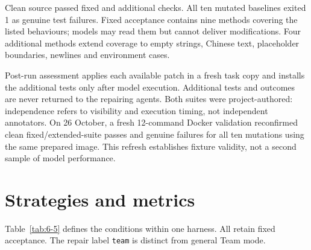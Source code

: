 Clean source passed fixed and additional checks. All ten mutated baselines exited 1 as genuine test failures. Fixed acceptance contains nine methods covering the listed behaviours; models may read them but cannot deliver modifications. Four additional methods extend coverage to empty strings, Chinese text, placeholder boundaries, newlines and environment cases.

Post-run assessment applies each available patch in a fresh task copy and installs the additional tests only after model execution. Additional tests and outcomes are never returned to the repairing agents. Both suites were project-authored: independence refers to visibility and execution timing, not independent annotators. On 26 October, a fresh 12-command Docker validation reconfirmed clean fixed/extended-suite passes and genuine failures for all ten mutations using the same prepared image. This refresh establishes fixture validity, not a second sample of model performance.

\section{Strategies and metrics}\label{sec:6.4}

Table~\ref{tab:6-5} defines the conditions within one harness. All retain fixed acceptance. The repair label \texttt{team} is distinct from general Team mode.


